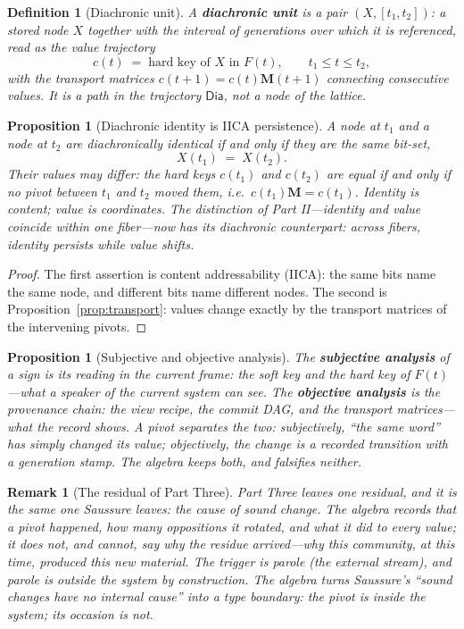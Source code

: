 \documentclass[11pt,a4paper]{article}
\newtheorem{definition}[principle]{Definition}
\newtheorem{proposition}[principle]{Proposition}
\newtheorem{remark}[principle]{Remark}
\theoremstyle{remark}
\newcommand{\Dia}{\ensuremath{\mathsf{Dia}}}             %
\newcommand{\Change}{\ensuremath{\mathbf{M}}}            %
\begin{document}
\begin{definition}[Diachronic unit]
\label{def:dia-unit}
A \textbf{diachronic unit} is a pair $(X, [t_1,t_2])$: a stored node $X$
together with the interval of generations over which it is referenced, read
as the value trajectory
\[
  c(t) \;=\; \text{hard key of } X \text{ in } F(t),
  \qquad t_1 \le t \le t_2,
\]
with the transport matrices $c(t{+}1) = c(t)\Change(t{+}1)$ connecting
consecutive values. It is a path in the trajectory $\Dia$, not a node of the
lattice.
\end{definition}

\begin{proposition}[Diachronic identity is IICA persistence]
\label{prop:dia-identity}
A node at $t_1$ and a node at $t_2$ are diachronically identical if and only
if they are the same bit-set,
\[
  X(t_1) \;=\; X(t_2) .
\]
Their values may differ: the hard keys $c(t_1)$ and $c(t_2)$ are equal if and
only if no pivot between $t_1$ and $t_2$ moved them, i.e.\
$c(t_1)\Change = c(t_1)$. Identity is content; value is coordinates. The
distinction of Part II---identity and value coincide within one fiber---now
has its diachronic counterpart: across fibers, identity persists while value
shifts.
\end{proposition}

\begin{proof}
The first assertion is content addressability (IICA): the same bits name the
same node, and different bits name different nodes. The second is
Proposition~\ref{prop:transport}: values change exactly by the transport
matrices of the intervening pivots.
\end{proof}

\begin{proposition}[Subjective and objective analysis]
\label{prop:subjective-objective}
The \textbf{subjective analysis} of a sign is its reading in the current
frame: the soft key and the hard key of $F(t)$---what a speaker of the
current system can see. The \textbf{objective analysis} is the provenance
chain: the view recipe, the commit DAG, and the transport matrices---what the
record shows. A pivot separates the two: subjectively, ``the same word'' has
simply changed its value; objectively, the change is a recorded transition
with a generation stamp. The algebra keeps both, and falsifies neither.
\end{proposition}

\begin{remark}[The residual of Part Three]
Part Three leaves one residual, and it is the same one Saussure leaves: the
\emph{cause} of sound change. The algebra records that a pivot happened, how
many oppositions it rotated, and what it did to every value; it does not, and
cannot, say why the residue arrived---why this community, at this time,
produced this new material. The trigger is parole (the external stream), and
parole is outside the system by construction. The algebra turns Saussure's
``sound changes have no internal cause'' into a type boundary: the pivot is
inside the system; its occasion is not.
\end{remark}
\end{document}
